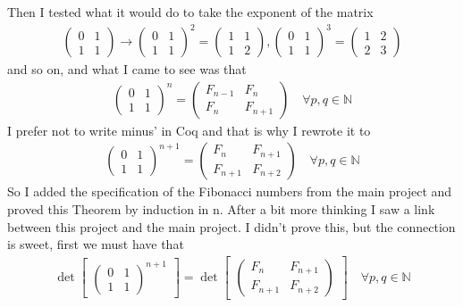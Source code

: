 \documentclass[a4paper,10p,danish]{article}
\begin{document}
Then I tested what it would do to take the exponent of the matrix 
\begin{align*}
\begin{pmatrix}
0 & 1\\
1 & 1 
\end{pmatrix}\rightarrow
\begin{pmatrix}
0 & 1\\
1 & 1 
\end{pmatrix}^2 = 
\begin{pmatrix}
1 & 1\\
1 & 2 
\end{pmatrix},
\begin{pmatrix}
0 & 1\\
1 & 1 
\end{pmatrix}^3 =  
\begin{pmatrix}
1 & 2\\
2 & 3 
\end{pmatrix}
\end{align*}
and so on, and what I came to see was that 
\begin{align*}
\begin{pmatrix}
0 & 1\\
1 & 1 
\end{pmatrix}^n = 
\begin{pmatrix}
F_{n-1} & F_n\\
F_n & F_{n+1}
\end{pmatrix}
\quad \forall p,q \in \mathbb{N}
\end{align*}
I prefer not to write minus' in Coq and that is why I rewrote it to
\begin{align*}
\begin{pmatrix}
0 & 1\\
1 & 1 
\end{pmatrix}^{n+1} = 
\begin{pmatrix}
F_n & F_{n+1}\\
F_{n+1} & F_{n+2}
\end{pmatrix}
\quad \forall p,q \in \mathbb{N}
\end{align*}
So I added the specification of the Fibonacci numbers from the main project and proved this Theorem by induction in n. After a bit more thinking I saw a link between this project and the main project. I didn't prove this, but the connection is sweet, first we must have that
\begin{align*}
\det
\begin{bmatrix}
\begin{pmatrix}
0 & 1\\
1 & 1 
\end{pmatrix}^{n+1}
\end{bmatrix} =
\det 
\begin{bmatrix}
\begin{pmatrix}
F_n & F_{n+1}\\
F_{n+1} & F_{n+2}
\end{pmatrix}
\end{bmatrix}
\quad \forall p,q \in \mathbb{N}
\end{align*}
\end{document}
